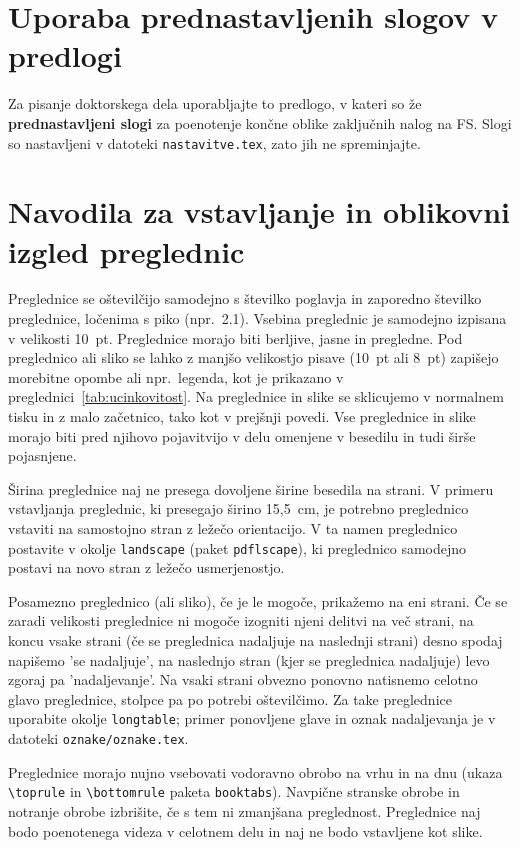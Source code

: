 \section*{Uporaba prednastavljenih slogov v predlogi}
Za pisanje doktorskega dela uporabljajte to predlogo, v kateri so že \textbf{prednastavljeni slogi} za poenotenje končne oblike zaključnih nalog na FS. Slogi so nastavljeni v datoteki \texttt{nastavitve.tex}, zato jih ne spreminjajte. 
\section*{Navodila za vstavljanje in oblikovni izgled preglednic}
Preglednice se oštevilčijo samodejno s številko poglavja in zaporedno številko preglednice, ločenima s piko (npr.~2.1). Vsebina preglednic je samodejno izpisana v velikosti 10~pt. Preglednice morajo biti berljive, jasne in pregledne. Pod preglednico ali sliko se lahko z manjšo velikostjo pisave (10~pt ali 8~pt) zapišejo morebitne opombe ali npr.~legenda, kot je prikazano v preglednici~\ref{tab:ucinkovitost}. Na preglednice in slike se sklicujemo v normalnem tisku in z malo začetnico, tako kot v prejšnji povedi. Vse preglednice in slike morajo biti pred njihovo pojavitvijo v delu omenjene v besedilu in tudi širše pojasnjene.

Širina preglednice naj ne presega dovoljene širine besedila na strani. V primeru vstavljanja preglednic, ki presegajo širino 15,5~cm, je potrebno preglednico vstaviti na samostojno stran z ležečo orientacijo. V ta namen preglednico postavite v okolje \verb|landscape| (paket \texttt{pdflscape}), ki preglednico samodejno postavi na novo stran z ležečo usmerjenostjo.

Posamezno preglednico (ali sliko), če je le mogoče, prikažemo na eni strani. Če se zaradi velikosti preglednice ni mogoče izogniti njeni delitvi na več strani, na koncu vsake strani (če se preglednica nadaljuje na naslednji strani) desno spodaj napišemo 'se nadaljuje', na naslednjo stran (kjer se preglednica nadaljuje) levo zgoraj pa 'nadaljevanje'. Na vsaki strani obvezno ponovno natisnemo celotno glavo preglednice, stolpce pa po potrebi oštevilčimo. Za take preglednice uporabite okolje \verb|longtable|; primer ponovljene glave in oznak nadaljevanja je v datoteki \texttt{oznake/oznake.tex}.

Preglednice morajo nujno vsebovati vodoravno obrobo na vrhu in na dnu (ukaza \verb|\toprule| in \verb|\bottomrule| paketa \texttt{booktabs}). Navpične stranske obrobe in notranje obrobe izbrišite, če s tem ni zmanjšana preglednost. Preglednice naj bodo poenotenega videza v celotnem delu in naj ne bodo vstavljene kot slike.

